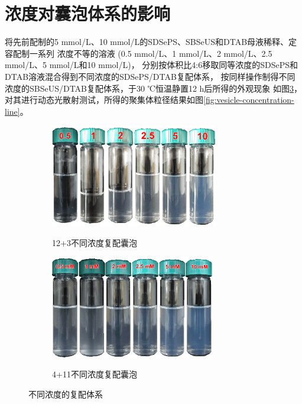 \documentclass[bachelor,fandolfonts,replaceperiod]{jnuthesis}
\begin{document}
    \section{浓度对囊泡体系的影响}
    将先前配制的5 mmol/L、10 mmol/L的SDSePS、SBSeUS和DTAB母液稀释、定容配制一系列
    浓度不等的溶液 (0.5 mmol/L、1 mmol/L、2 mmol/L、2.5 mmol/L、5 mmol/L和10 mmol/L)，
    分别按体积比4:6移取同等浓度的SDSePS和DTAB溶液混合得到不同浓度的SDSePS/DTAB复配体系，
    按同样操作制得不同浓度的SBSeUS/DTAB复配体系，于30 ℃恒温静置12 h后所得的外观现象
    如图\ref{fig:不同浓度的复配体系}，对其进行动态光散射测试，所得的聚集体粒径结果如图\ref{fig:vesicle-concentration-line}。
    \begin{figure}[htbp]
        \centering
        \begin{subfigure}[]{\textwidth}
            \centering
            \includegraphics[height=4.5cm]{figure/SDSePS-concentration.png}\\
            \caption{12+3不同浓度复配囊泡}\label{fig:vesicle-SDSePS-concentration}
        \end{subfigure}%
        
        \begin{subfigure}[]{\textwidth}
            \centering
            \includegraphics[height=4.5cm]{figure/SBSeUS-concentration.png}\\
            \caption{4+11不同浓度复配囊泡}\label{fig:vesicle-SBSeUS-concentration}
        \end{subfigure}%
        \caption{不同浓度的复配体系}
        \label{fig:不同浓度的复配体系}
    \end{figure}
    
\end{document}
